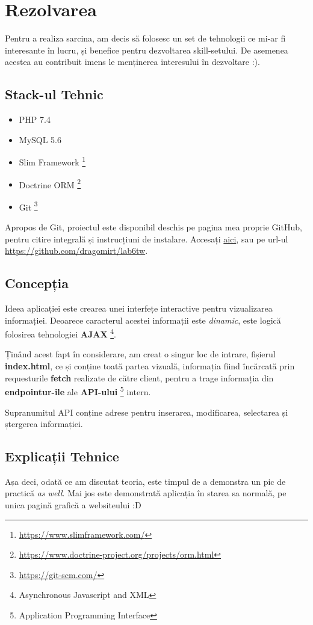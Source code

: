\documentclass[12pt. a4paper]{report}
\begin{document}
\chapter{Rezolvarea}
Pentru a realiza sarcina, am decis să folosesc un set de tehnologii ce mi-ar fi interesante în lucru, și benefice pentru dezvoltarea skill-setului. De asemenea acestea au contribuit imens le menținerea interesului în dezvoltare :).

\section{Stack-ul Tehnic}
\begin{itemize}
	\item PHP 7.4
	\item MySQL 5.6
	\item Slim Framework \footnote{\url{https://www.slimframework.com/}}
	\item Doctrine ORM \footnote{\url{https://www.doctrine-project.org/projects/orm.html}}
	\item Git \footnote{\url{https://git-scm.com/}}
\end{itemize}

Apropos de Git, proiectul este disponibil deschis pe pagina mea proprie GitHub, pentru citire integrală și instrucțiuni de instalare. Accesați \href{https://github.com/dragomirt/lab6tw}{aici}, sau pe url-ul \url{https://github.com/dragomirt/lab6tw}.

\section{Concepția}
Ideea aplicației este crearea unei interfețe interactive pentru vizualizarea informației. Deoarece caracterul acestei informații este 
\emph{dinamic}, este logică folosirea tehnologiei \textbf{AJAX} \footnote{Asynchronous Javascript and XML}. 

Ținând acest fapt în considerare, am creat o singur loc de intrare, fișierul \textbf{index.html}, ce și conține toată partea vizuală, informația fiind încărcată prin requesturile \textbf{fetch} realizate de către client, pentru a trage informația din \textbf{endpointur-ile} ale \textbf{API-ului} \footnote{Application Programming Interface} intern.

Supranumitul API conține adrese pentru inserarea, modificarea, selectarea și ștergerea informației.

\section{Explicații Tehnice}
Așa deci, odată ce am discutat teoria, este timpul de a demonstra un pic de practică \emph{as well}. Mai jos este demonstrată aplicația în starea sa normală, pe unica pagină grafică a websiteului :D
\end{document}
